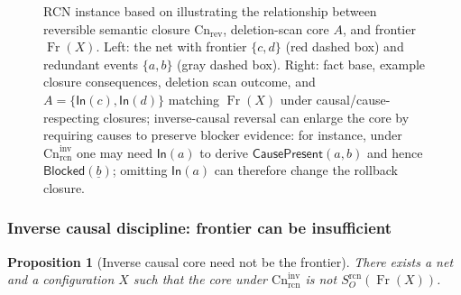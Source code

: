 \documentclass[twoside]{article}
\DeclareMathOperator{\Fr}{Fr}
\newtheorem{proposition}[theorem]{Proposition}
\newcommand{\Cn}{\mathrm{Cn}}
\newcommand{\1}{\mathbf{1}}
\begin{document}
\begin{figure}[t]

\caption{RCN instance based on \cite[Fig.~8]{melgratti2024reversible} illustrating the relationship between reversible semantic closure
\(\Cn_{\mathrm{rev}}\), deletion-scan core \(A\), and frontier \(\Fr(X)\).
Left: the net with frontier \(\{c,d\}\) (red dashed box) and redundant events \(\{a,b\}\) (gray dashed box).
Right: fact base, example closure consequences, deletion scan outcome, and \(A=\{\mathsf{In}(c),\mathsf{In}(d)\}\) matching \(\Fr(X)\)
under causal/cause-respecting closures; inverse-causal reversal can enlarge the core by requiring causes to preserve blocker evidence:
for instance, under \(\Cn^{\mathrm{inv}}_{\mathrm{rcn}}\) one may need \(\mathsf{In}(a)\) to derive
\(\mathsf{CausePresent}(a,b)\) and hence \(\mathsf{Blocked}(\underline{b})\); omitting \(\mathsf{In}(a)\) can therefore change the rollback closure.}
\label{fig:rcn-fig8-core-frontier-closure}
\end{figure}


\subsubsection{Inverse causal discipline: frontier can be insufficient}
\label{sec:rcn-core-inverse-example}

\begin{proposition}[Inverse causal core need not be the frontier]
\label{prop:inverse-core-not-frontier}
There exists a net and a configuration \(X\) such that the core under \(\Cn^{\mathrm{inv}}_{\mathrm{rcn}}\) is \emph{not}
\(S_O^{\mathrm{rcn}}(\Fr(X))\).
\end{proposition}
\end{document}
